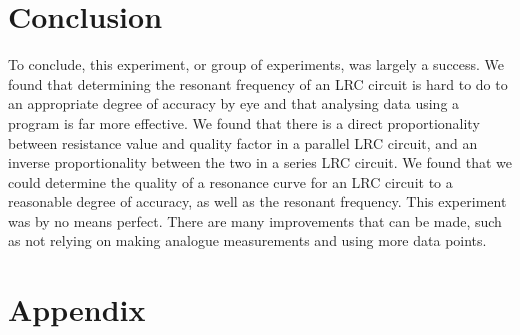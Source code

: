\documentclass[12pt]{article}
\numberwithin{equation}{section}
\numberwithin{figure}{section}
\begin{document}
    \section{Conclusion}\label{sec:Colclusion}
    To conclude, this experiment, or group of experiments, was largely a success. We found that 
    determining the resonant frequency of an LRC circuit is hard to do to an appropriate degree 
    of accuracy by eye and that analysing data using a program is far more effective. We found that there 
    is a direct proportionality between resistance value and quality factor in a parallel LRC circuit, 
    and an inverse proportionality between the two in a series LRC circuit. We found that we could 
    determine the quality of a resonance curve for an LRC circuit to a reasonable degree of accuracy, 
    as well as the resonant frequency. \newline
    This experiment was by no means perfect. There are many improvements that can be made, such as not 
    relying on making analogue measurements and using more data points. 

    \newpage
    \section{Appendix}
    \setcounter{figure}{0} \renewcommand{\thefigure}{A.\arabic{figure}}
    
    
    


    
\end{document}
